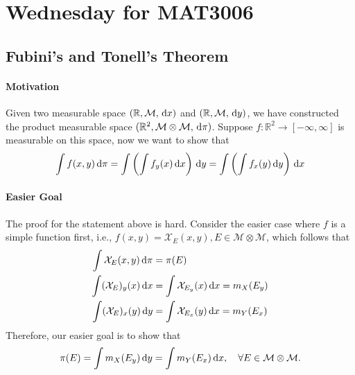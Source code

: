 
\section{Wednesday for MAT3006}
\subsection{Fubini's and Tonell's Theorem}
\paragraph{Motivation}
Given two measurable space 
$(\mathbb{R},\mathcal{M},\,\mathrm{d} x)$ and $(\mathbb{R},\mathcal{M},\,\mathrm{d} y)$,
we have constructed the product measurable space 
$(\mathbb{R}^2,\mathcal{M}\otimes\mathcal{M},\,\mathrm{d}\pi)$.
Suppose $f:\mathbb{R}^2\to[-\infty,\infty]$ is measurable on this space, now we want to show that
\[
\int f(x,y)\,\mathrm{d}\pi
=
\int\left(
\int f_y(x)\,\mathrm{d} x
\right)\,\mathrm{d} y
=
\int
\left(
\int f_x(y)\,\mathrm{d} y
\right)
\,\mathrm{d} x
\]

\paragraph{Easier Goal}
The proof for the statement above is hard. 
Consider the easier case where $f$ is a simple function first, i.e., 
$f(x,y)=\mathcal{X}_E(x,y), E\in\mathcal{M}\otimes\mathcal{M}$, which follows that
\begin{align*}
\int \mathcal{X}_E(x,y)\,\mathrm{d}\pi&=\pi(E)\\
\int(\mathcal{X}_E)_y(x)\,\mathrm{d} x
&=
\int \mathcal{X}_{E_y}(x)\,\mathrm{d} x
=
m_X(E_y)\\
\int(\mathcal{X}_E)_x(y)\,\mathrm{d} y
&=
\int \mathcal{X}_{E_x}(y)\,\mathrm{d} x
=
m_Y(E_x)
\end{align*}
Therefore, our easier goal is to show that 
\begin{equation}\label{Eq:13:1}
\pi(E)=\int m_X(E_y)\diff y=\int m_Y(E_x)\diff x,\quad
\forall E\in\mathcal{M}\otimes\mathcal{M}.
\end{equation}


